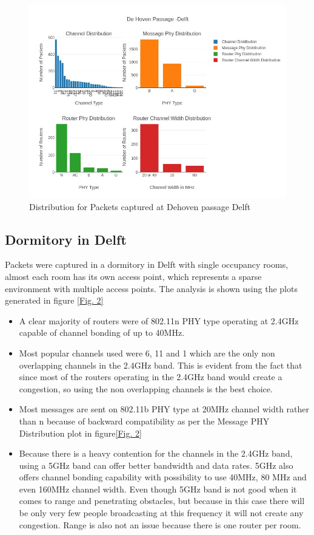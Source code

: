 \documentclass{article}
\begin{document}
\begin{figure}[h]
      	\centering
     	\includegraphics[scale=0.55]{De Hoven Passage -Delft.jpeg}
      	\caption{Distribution for Packets captured at Dehoven passage Delft}
      	\label{Fig. 1}
\end{figure}




\subsection{Dormitory in Delft}
Packets were captured in a dormitory in Delft with single occupancy rooms, almost each room has its own access point, which represents a sparse environment with multiple access points. The analysis is shown using the plots generated in figure \ref{Fig. 2}

\begin{itemize}
    \item A clear majority of routers were of 802.11n PHY type operating at 2.4GHz capable of channel bonding of up to 40MHz. 
    \item Most popular channels used were 6, 11 and 1 which are the only non overlapping channels in the 2.4GHz band. This is evident from the fact that since most of the routers operating in the 2.4GHz band would create a congestion, so using the non overlapping channels is the best choice. 
    \item Most messages are sent on 802.11b PHY type at 20MHz channel width rather than n because of backward compatibility as per the Message PHY Distribution plot in figure\ref{Fig. 2}
    \item Because there is a heavy contention for the channels in the 2.4GHz band, using a 5GHz band can offer better bandwidth and data rates. 5GHz also offers channel bonding capability with possibility to use 40MHz, 80 MHz and even 160MHz channel width. Even though 5GHz band is not good when it comes to range and penetrating obstacles, but because in this case there will be only very few people broadcasting at this frequency it will not create any congestion. Range is also not an issue because there is one router per room.
    
\end{itemize}
\end{document}
